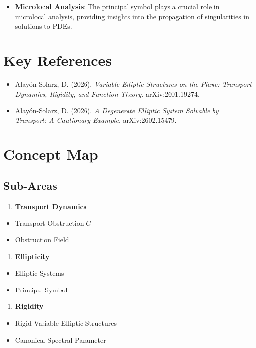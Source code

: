 \documentclass[11pt,a4paper]{article}
\begin{document}
\begin{itemize}
\item \textbf{Microlocal Analysis}: The principal symbol plays a crucial role in microlocal analysis, providing insights into the propagation of singularities in solutions to PDEs.
\end{itemize}

\section{Key References}

\begin{itemize}
\item Alayón-Solarz, D. (2026). \textit{Variable Elliptic Structures on the Plane: Transport Dynamics, Rigidity, and Function Theory}. arXiv:2601.19274.
\item Alayón-Solarz, D. (2026). \textit{A Degenerate Elliptic System Solvable by Transport: A Cautionary Example}. arXiv:2602.15479.
\end{itemize}

\section{Concept Map}

\subsection{Sub-Areas}

\begin{enumerate}
\item \textbf{Transport Dynamics}
\end{enumerate}
\begin{itemize}
\item Transport Obstruction \( G \)
\item Obstruction Field
\end{itemize}

\begin{enumerate}
\item \textbf{Ellipticity}
\end{enumerate}
\begin{itemize}
\item Elliptic Systems
\item Principal Symbol
\end{itemize}

\begin{enumerate}
\item \textbf{Rigidity}
\end{enumerate}
\begin{itemize}
\item Rigid Variable Elliptic Structures
\item Canonical Spectral Parameter
\end{itemize}
\end{document}
